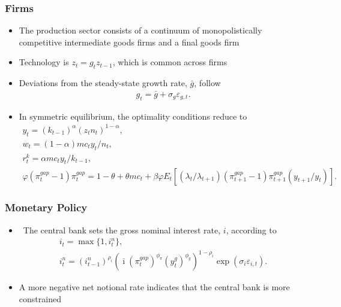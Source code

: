 \documentclass[11pt]{beamer}
\begin{document}
\begin{frame}\frametitle{Firms}
\begin{itemize}\setlength{\itemsep}{8pt}
\item <1-|handout:1>The production sector consists of a continuum of monopolistically competitive intermediate goods firms and a final goods firm 
\item <2-|handout:1>Technology is $z_t = g_tz_{t-1}$, which is common across firms
\item <3-|handout:1>Deviations from the steady-state growth rate, $\bar{g}$, follow
\begin{gather*}
  g_t = \bar{g} + \sigma_g\varepsilon_{g,t}.
\end{gather*}
\item <4-|handout:1>In symmetric equilibrium, the optimality conditions reduce to
\scriptsize
\begin{gather*}
  y_t = (k_{t-1})^\alpha(z_tn_t)^{1-\alpha},\\
  w_t = (1-\alpha)mc_ty_t/n_t,\\
  r_t^k = \alpha mc_t y_t/k_{t-1},\\
  \varphi(\pi_t^{gap}-1)\pi_t^{gap} = 1-\theta + \theta mc_t + \beta\varphi E_t[(\lambda_t/\lambda_{t+1})(\pi_{t+1}^{gap}-1)\pi_{t+1}^{gap}(y_{t+1}/y_t)].
\end{gather*}
\normalfont
\end{itemize}
\end{frame}
\begin{frame}\frametitle{Monetary Policy}
\begin{itemize} \setlength{\itemsep}{14pt}
\item <1-|handout:1>\ 
The central bank sets the gross nominal interest rate, $i$, according to
\begin{gather*}
    i_t=\max\{1,i_t^n\},\\
  i_t^n=(i^n_{t-1})^{\rho_i}(\bar{\imath}(\pi^{gap}_t)^{\phi_\pi}(y^{g}_{t})^{\phi_y})^{1-\rho_i}\exp(\sigma_i\varepsilon_{i,t}). 
\end{gather*}
\item <2-|handout:1>A more negative net notional rate indicates that the central bank is more constrained
\end{itemize}
\end{frame}
\end{document}
